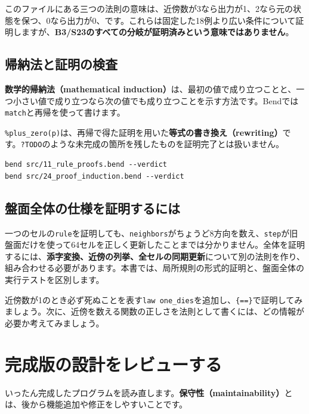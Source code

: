 \documentclass[11pt,a4paper,openany]{book}
\newcommand{\code}[1]{\texttt{#1}}
\newcommand{\term}[1]{\textbf{#1}}
\newcommand{\readcode}[2]{}
\newcommand{\exercise}[1]{\begin{exercisebox}#1\end{exercisebox}}
\begin{document}
このファイルにある三つの法則の意味は、近傍数が3なら出力が1、2なら元の状態を保つ、0なら出力が0、です。これらは固定した18例より広い条件について証明しますが、\textbf{B3/S23のすべての分岐が証明済みという意味ではありません}。

\section{帰納法と証明の検査}
\term{数学的帰納法（mathematical induction）}は、最初の値で成り立つことと、一つ小さい値で成り立つなら次の値でも成り立つことを示す方法です。Bendでは\code{match}と再帰を使って書けます。
\readcode{24_proof_induction.bend}{自然数を用いた帰納法と書き換え（24\_proof\_induction.bend）}
\code{\%plus\_zero(p)}は、再帰で得た証明を用いた\term{等式の書き換え（rewriting）}です。\code{?TODO}のような未完成の箇所を残したものを証明完了とは扱いません。
\begin{lstlisting}[language={},caption={Bendの証明検査}]
bend src/11_rule_proofs.bend --verdict
bend src/24_proof_induction.bend --verdict
\end{lstlisting}

\section{盤面全体の仕様を証明するには}
一つのセルの\code{rule}を証明しても、\code{neighbors}がちょうど8方向を数え、\code{step}が旧盤面だけを使って64セルを正しく更新したことまでは分かりません。全体を証明するには、\textbf{添字変換、近傍の列挙、全セルの同期更新}について別の法則を作り、組み合わせる必要があります。本書では、局所規則の形式的証明と、盤面全体の実行テストを区別します。

\exercise{近傍数が1のとき必ず死ぬことを表す\code{law one\_dies}を追加し、\code{\{==\}}で証明してみましょう。次に、近傍を数える関数の正しさを法則として書くには、どの情報が必要か考えてみましょう。}

\chapter{完成版の設計をレビューする}
\begin{tcolorbox}[colback=blue!3,colframe=blue!16,boxrule=.35pt,arc=1mm,left=3mm,right=3mm,top=2mm,bottom=2mm]
\small いったん完成したプログラムを読み直します。\term{保守性（maintainability）}とは、後から機能追加や修正をしやすいことです。
\end{tcolorbox}
\end{document}
